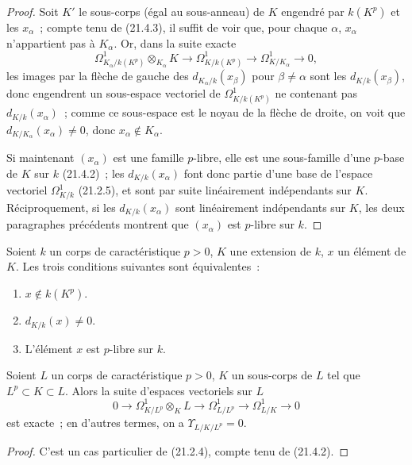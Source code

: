 \begin{proof}
Soit $K'$ le sous-corps (égal au sous-anneau) de $K$ engendré par
$k(K^p)$ et les $x_\alpha$~; compte tenu de (21.4.3), il suffit de voir que,
pour chaque $\alpha$, $x_\alpha$ n'appartient pas à $K_\alpha$. Or, dans la
suite exacte
\[
\Omega^1_{K_\alpha/k(K^p)}\otimes_{K_\alpha}K\longrightarrow
\Omega^1_{K/k(K^p)}\longrightarrow\Omega^1_{K/K_\alpha}\longrightarrow0,
\]
les images par la flèche de gauche des $d_{K_\alpha/k}(x_\beta)$ pour
$\beta\neq\alpha$ sont les $d_{K/k}(x_\beta)$, donc engendrent un sous-espace
vectoriel de $\Omega^1_{K/k(K^p)}$ ne contenant pas $d_{K/k}(x_\alpha)$~; comme
ce sous-espace est le noyau de la flèche de droite, on voit que
$d_{K/K_\alpha}(x_\alpha)\neq0$, donc $x_\alpha\notin K_\alpha$.

Si maintenant $(x_\alpha)$ est une famille $p$-libre, elle est une sous-famille
d'une $p$-base de $K$ sur $k$ (21.4.2)~; les $d_{K/k}(x_\alpha)$ font donc
partie d'une base de l'espace vectoriel $\Omega^1_{K/k}$ (21.2.5), et sont
par suite linéairement indépendants sur $K$. Réciproquement, si les
$d_{K/k}(x_\alpha)$ sont linéairement indépendants sur $K$, les deux
paragraphes précédents montrent que $(x_\alpha)$ est $p$-libre sur $k$.
\end{proof}

\begin{corollary}[21.4.6]
\label{0.21.4.6-fr}
Soient $k$ un corps de caractéristique $p>0$, $K$ une extension de $k$,
$x$ un élément de $K$. Les trois conditions suivantes sont équivalentes~:
\begin{enumerate}
  \item[a)] $x\notin k(K^p)$.
  \item[b)] $d_{K/k}(x)\neq0$.
  \item[c)] L'élément $x$ est $p$-libre sur $k$.
\end{enumerate}
\end{corollary}

\begin{proposition}[21.4.7]
\label{0.21.4.7-fr}
Soient $L$ un corps de caractéristique $p>0$, $K$ un sous-corps de $L$ tel
que $L^p\subset K\subset L$. Alors la suite d'espaces vectoriels sur $L$
\begin{equation}
\tag{21.4.7.1}\label{0.21.4.7.1-fr}
0\to\Omega^1_{K/L^p}\otimes_KL\to\Omega^1_{L/L^p}
\to\Omega^1_{L/K}\to0
\end{equation}
est exacte~; en d'autres termes, on a $\Upsilon_{L/K/L^p}=0$.
\end{proposition}
\begin{proof}
C'est un cas particulier de (21.2.4), compte tenu de (21.4.2).
\end{proof}

